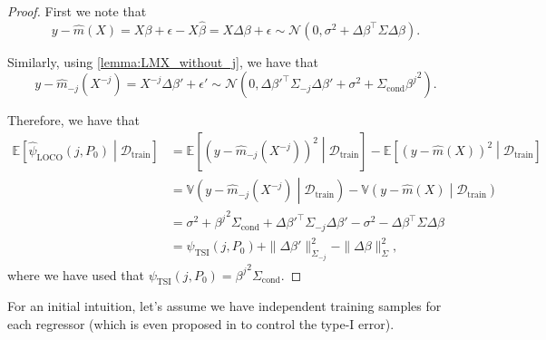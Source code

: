 \documentclass{article}
\theoremstyle{plain}
\theoremstyle{definition}
\theoremstyle{remark}
\newcommand{\e}[1]{\mathbb{E}\left[#1\right]  } %
\begin{document}
\begin{proof}
First we note that $$y-\widehat{m}(X)=X\beta+\epsilon-X\widehat{\beta}=X\Delta\beta+\epsilon\sim \mathcal{N}(0, \sigma^2+\Delta\beta^\top\Sigma\Delta\beta).$$

Similarly, using \cref{lemma:LMX_without_j}, we have that $$y-\widehat{m}_{-j}(X^{-j})=X^{-j}\Delta\beta'+\epsilon'\sim\mathcal{N}(0, \Delta\beta'^\top\Sigma_{-j}\Delta\beta'+\sigma^2 + \Sigma_\mathrm{cond}{\beta^j}^2).$$

Therefore, we have that 
\begin{align*}
    \e{\widehat{\psi}_\mathrm{LOCO}(j, P_0)\middle|\mathcal{D}_\mathrm{train}}&= \e{(y-\widehat{m}_{-j}(X^{-j}))^2\middle|\mathcal{D}_\mathrm{train}}-\e{(y-\widehat{m}(X))^2\middle|\mathcal{D}_\mathrm{train}}\\&=
    \mathbb{V}\left(y-\widehat{m}_{-j}(X^{-j})\middle|\mathcal{D}_\mathrm{train}\right) - \mathbb{V}\left(y-\widehat{m}(X)\middle|\mathcal{D}_\mathrm{train}\right)\\ %
    &= \sigma^2+{\beta^j}^2\Sigma_\mathrm{cond}+\Delta\beta'^\top\Sigma_{-j}\Delta\beta'-\sigma^2-\Delta\beta^\top\Sigma\Delta\beta\\
    &=\psi_{\mathrm{TSI}}(j, P_0)+\|\Delta\beta'\|^2_{\Sigma_{-j}}-\|\Delta\beta\|^2_\Sigma,
\end{align*}
where we have used that $\psi_{\mathrm{TSI}}(j, P_0)={\beta^j}^2\Sigma_\mathrm{cond}$.

\end{proof}

For an initial intuition, let's assume we have independent training samples for each regressor (which is even proposed in \citet{williamson2023general} to control the type-I error).
\end{document}
